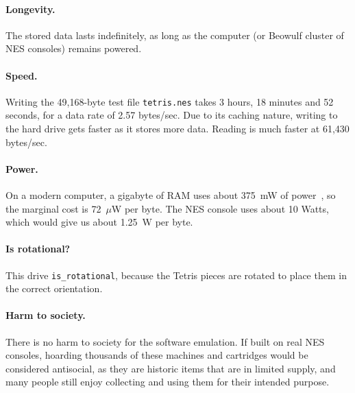 \documentclass[twocolumn]{article}
\begin{document}
\paragraph{Longevity.} The stored data lasts indefinitely, as long as
the computer (or Beowulf cluster of NES consoles) remains powered.

\paragraph{Speed.} Writing the 49,168-byte test file {\tt tetris.nes}
takes 3 hours, 18 minutes and 52 seconds, for a data rate of 2.57
bytes/sec. Due to its caching nature, writing to the hard drive gets
faster as it stores more data. Reading is much faster at 61,430 bytes/sec.

\paragraph{Power.} On a modern computer, a gigabyte of RAM uses about 375~mW of power~\cite{crucialpower}, so the marginal cost is 72~$\mu$W per byte.
The NES console uses about 10 Watts, which would give us about 1.25~W per
byte.

\paragraph{Is rotational?} This drive \verb+is_rotational+, because the
Tetris pieces are rotated to place them in the correct orientation.

\paragraph{Harm to society.} There is no harm to society for the software
emulation. If built on real NES consoles, hoarding thousands of these
machines and cartridges would be considered antisocial, as they are
historic items that are in limited supply, and many people still enjoy
collecting and using them for their intended purpose.
\end{document}

